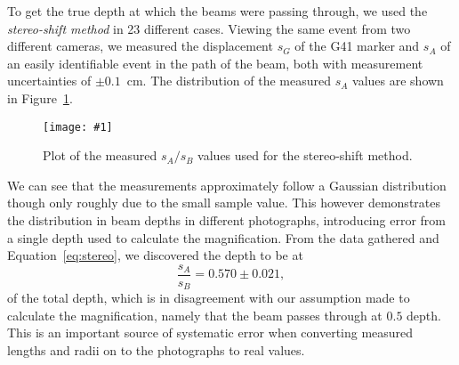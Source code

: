 \documentclass[twocolumn]{article}
\newcommand{\insertFigure}[1]{%
   \texttt{[image: \#1]}%
}
\begin{document}
\par To get the true depth at which the beams were passing through, we used the \textit{stereo-shift method} in 23 different cases. Viewing the same event from two different cameras, we measured the displacement $s_G$ of the G41 marker and $s_A$ of an easily identifiable event in the path of the beam, both with measurement uncertainties of $\pm 0.1$~cm. The distribution of the measured $s_A$ values are shown in Figure~\ref{fig:box}.
\begin{figure}[!h]
	\centering
	\insertFigure{box.png}
	\caption{Plot of the measured $s_A/s_B$ values used for the stereo-shift method.}
	\label{fig:box}
\end{figure}
We can see that the measurements approximately follow a Gaussian distribution though only roughly due to the small sample value. This however demonstrates the distribution in beam depths in different photographs, introducing error from a single depth used to calculate the magnification. From the data gathered and Equation~\ref{eq:stereo}, we discovered the depth to be at
\begin{equation*}
\frac{s_A}{s_B} = 0.570 \pm 0.021,
\end{equation*}
of the total depth, which is in disagreement with our assumption made to calculate the magnification, namely that the beam passes through at $0.5$ depth. This is an important source of systematic error when converting measured lengths and radii on to the photographs to real values.
\end{document}
